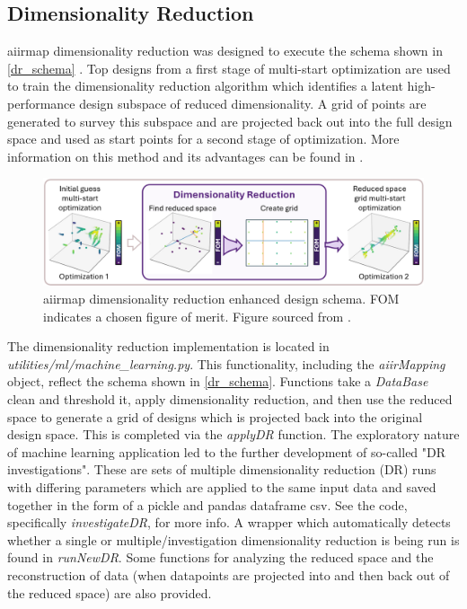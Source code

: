 \documentclass[a4paper,12pt,english]{article}
\begin{document}
    \subsection{Dimensionality Reduction} \label{dr}
    aiirmap dimensionality reduction was designed to execute the schema shown in \autoref{dr_schema} \cite{ml-paper}. Top designs from a first stage of multi-start optimization are used to train the dimensionality reduction algorithm which identifies a latent high-performance design subspace of reduced dimensionality. A grid of points are generated to survey this subspace and are projected back out into the full design space and used as start points for a second stage of optimization. More information on this method and its advantages can be found in \cite{ml-paper}. \\

    \begin{figure}
        \centering
        \includegraphics[width=\linewidth]{dr_schema.png}
        \caption{aiirmap dimensionality reduction enhanced design schema. FOM indicates a chosen figure of merit. Figure sourced from \cite{ml-paper}.}
        \label{dr_schema}
    \end{figure}

    The dimensionality reduction implementation is located in \textit{utilities/ml/machine\_learning.py}. This functionality, including the \textit{aiirMapping} object, reflect the schema shown in \autoref{dr_schema}. Functions take a \textit{DataBase} clean and threshold it, apply dimensionality reduction, and then use the reduced space to generate a grid of designs which is projected back into the original design space. This is completed via the \textit{applyDR} function. The exploratory nature of machine learning application led to the further development of so-called "DR investigations". These are sets of multiple dimensionality reduction (DR) runs with differing parameters which are applied to the same input data and saved together in the form of a pickle and pandas dataframe csv. See the code, specifically \textit{investigateDR}, for more info. A wrapper which automatically detects whether a single or multiple/investigation dimensionality reduction is being run is found in \textit{runNewDR}. Some functions for analyzing the reduced space and the reconstruction of data (when datapoints are projected into and then back out of the reduced space) are also provided.  \\         
\end{document}
